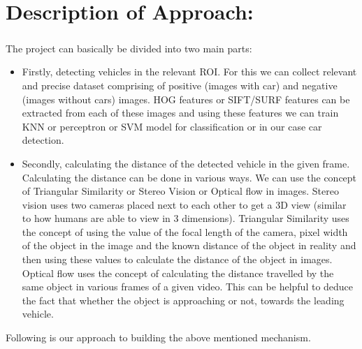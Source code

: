 \documentclass{article}
\begin{document}
	\section*{Description of Approach:}
	\subparagraph{}
	The project can basically be divided into two main parts:
	\begin{itemize}
	\item Firstly, detecting vehicles in the relevant ROI. For this we can collect relevant and precise dataset comprising of positive (images with car) and negative (images without cars) images. HOG features or SIFT/SURF features can be extracted from each of these images and using these features we can train KNN or perceptron or SVM model for classification or in our case car detection.
	\item Secondly, calculating the distance of the detected vehicle in the given frame. Calculating the distance can be done in various ways. We can use the concept of Triangular Similarity or Stereo Vision or Optical flow in images. Stereo vision uses two cameras placed next to each other to get a 3D view (similar to how humans are able to view in 3 dimensions). Triangular Similarity uses the concept of using the value of the focal length of the camera, pixel width of the object in the image and the known distance of the object in reality and then using these values to calculate the distance of the object in images. Optical flow uses the concept of calculating the distance travelled by the same object in various frames of a given video. This can be helpful to deduce the fact that whether the object is approaching or not, towards the leading vehicle.
	\end{itemize}
	Following is our approach to building the above mentioned mechanism.
\end{document}
